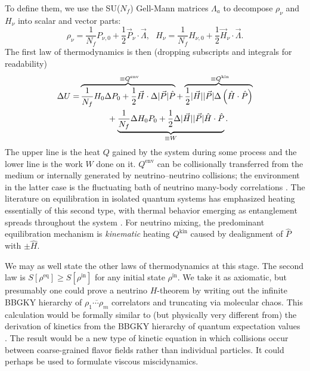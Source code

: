 \documentclass[aps,prl,twocolumn,groupedaddress]{revtex4-2}
\begin{document}
To define them, we use the SU($N_f$) Gell-Mann matrices $\Lambda_a$ to decompose $\rho_\nu$ and $H_\nu$ into scalar and vector parts:
\begin{equation}
\rho_\nu = \frac{1}{N_f} P_{\nu,0} + \frac{1}{2} \vec{P}_\nu \cdot \vec{\Lambda}, ~~~ H_\nu = \frac{1}{N_f} H_{\nu,0} + \frac{1}{2} \vec{H}_\nu \cdot \vec{\Lambda}.
\end{equation}
The first law of thermodynamics is then (dropping subscripts and integrals for readability)
\begin{align}
\Delta U = &\overbrace{\frac{1}{N_f} H_0 \Delta P_0 + \frac{1}{2} \vec{H} \cdot \Delta| \vec{P}| \hat{P}}^{~ \equiv Q^\textrm{env}} + \overbrace{\frac{1}{2} | \vec{H} | | \vec{P} | \Delta \left( \hat{H} \cdot \hat{P} \right)}^{~ \equiv Q^\textrm{kin}} \notag \\
&~~~~~~~~~~ +\underbrace{\frac{1}{N_f} \Delta H_0 P_0 + \frac{1}{2} \Delta | \vec{H} | | \vec{P} | \hat{H} \cdot \hat{P}}_{\equiv  W}. \label{eq:firstlaw}
\end{align}
The upper line is the heat $Q$ gained by the system during some process and the lower line is the work $W$ done on it. $Q^\textrm{env}$ can be collisionally transferred from the medium or internally generated by neutrino--neutrino collisions; the environment in the latter case is the fluctuating bath of neutrino many-body correlations \cite{johns2023b}. The literature on equilibration in isolated quantum systems has emphasized heating essentially of this second type, with thermal behavior emerging as entanglement spreads throughout the system \cite{gogolin2016, dalessio2016, ueda2020}. For neutrino mixing, the predominant equilibration mechanism is \textit{kinematic} heating $Q^\textrm{kin}$ caused by dealignment of $\hat{P}$ with $\pm \hat{H}$.

We may as well state the other laws of thermodynamics at this stage. The second law is $S[\rho^\textrm{eq}] \geq S[\rho^\textrm{in}]$ for any initial state $\rho^\textrm{in}$. We take it as axiomatic, but presumably one could prove a neutrino $H$-theorem by writing out the infinite BBGKY hierarchy of $\overline{\rho_1 \dotsb \rho_m}$ correlators and truncating via molecular chaos. This calculation would be formally similar to (but physically very different from) the derivation of kinetics from the BBGKY hierarchy of quantum expectation values \cite{volpe2013, froustey2020}. The result would be a new type of kinetic equation in which collisions occur between coarse-grained flavor fields rather than individual particles. It could perhaps be used to formulate viscous miscidynamics.
\end{document}
